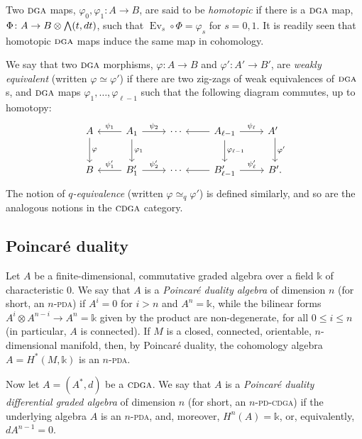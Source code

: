 \documentclass{article}
\numberwithin{equation}{section}
\theoremstyle{definition}
\renewcommand{\k}{\mathbb{k}}
\newcommand{\dga}{\ensuremath{\textsc{dga}}}
\newcommand{\cdga}{\ensuremath{\textsc{cdga}}}
\DeclareMathOperator{\Ev}{Ev}
\newcommand{\bwedge}{\mbox{\normalsize $\bigwedge$}}
\begin{document}
Two $\dga$ maps, $\varphi_0, \varphi_1\colon A\to B$, are 
said to be {\em homotopic}\/ if there is a $\dga$ map, 
$\Phi\colon A\to B \otimes \bwedge (t, dt)$, 
such that $\Ev_s\circ \Phi = \varphi_s$ for $s=0,1$. 
It is readily seen that homotopic $\dga$ maps induce the same 
map in cohomology. 

We say that two $\dga$ morphisms, $\varphi\colon A \to B$ and 
$\varphi'\colon A' \to B'$, are {\em weakly equivalent}\/ (written 
$\varphi\simeq \varphi'$) if there are two zig-zags of 
weak equivalences of $\dga$s, and $\dga$ maps 
$\varphi_1, \dots, \varphi_{\ell -1}$ such that 
the following diagram commutes, up to homotopy:
\begin{equation}
\label{eq:ziggy-zagg}
\begin{tikzcd}[row sep=22pt]
A \ar[d, "\varphi"] & A_1 \ar[d, "\varphi_1"] \ar[l, "\psi_1"']  \ar[r, "\psi_2"] 
& \cdots & A_{\ell-1}  \ar[d, "\varphi_{\ell-1}"] \ar[l]\ar[r, "\psi_{\ell}"] 
& A' \ar[d, "\varphi'"]\, \phantom{.}
\\
B& B'_1 
 \ar[l, "\psi'_1"']  \ar[r, "\psi'_2"] & \cdots 
& B'_{\ell-1} \ar[l]\ar[r, "\psi'_{\ell}"] & B'  .  
\end{tikzcd}
\end{equation}
The notion of {\em $q$-equivalence}\/ (written 
$\varphi\simeq_q \varphi'$) is defined similarly, 
and so are the analogous notions in the $\cdga$ category.

\subsection{Poincar\'{e} duality}
\label{subsec:pd}
Let $A$ be a finite-dimensional, 
commutative graded algebra over a field $\k$ of characteristic $0$. 
We say that $A$ is a {\em Poincar\'{e} duality algebra}\/ of dimension $n$ 
(for short, an $n$-\textsc{pda}) if $A^i=0$ for $i>n$ and $A^n=\k$, 
while the bilinear forms $A^{i}\otimes A^{n-i}\to A^n=\k$ 
given by the product are non-degenerate, for all $0\le i\le n$ 
(in particular, $A$ is connected).  If $M$ is a closed, 
connected, orientable, $n$-dimensional manifold, then, 
by Poincar\'{e} duality, the cohomology algebra $A=H^{*}(M,\k)$ 
is an $n$-\textsc{pda}. 

Now let $A=(A^{*}, d)$ be a $\cdga$.  We say that $A$ is a 
{\em Poincar\'{e} duality differential graded algebra}\/ of dimension $n$ 
(for short, an $n$-\textsc{pd-cdga}) if the underlying algebra $A$ is an 
$n$-\textsc{pda}, and, moreover,  $H^n(A)=\k$, or, equivalently, 
$d A^{n-1}=0$. 
\end{document}
